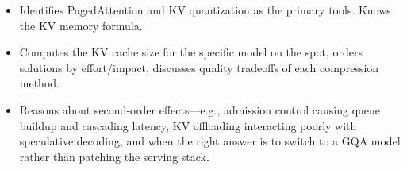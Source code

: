 \begin{interviewq}

\goodgreat
\begin{itemize}
    \item {} Identifies PagedAttention and KV quantization as the primary tools. Knows the KV memory formula.
    \item {} Computes the KV cache size for the specific model on the spot, orders solutions by effort/impact, discusses quality tradeoffs of each compression method.
    \item {} Reasons about second-order effects---e.g., admission control causing queue buildup and cascading latency, KV offloading interacting poorly with speculative decoding, and when the right answer is to switch to a GQA model rather than patching the serving stack.
\end{itemize}

\end{interviewq}


